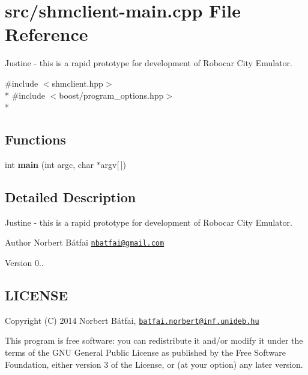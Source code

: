 \hypertarget{shmclient-main_8cpp}{\section{src/shmclient-\/main.cpp File Reference}
\label{shmclient-main_8cpp}
}


Justine -\/ this is a rapid prototype for development of Robocar City Emulator.  


{\ttfamily \#include $<$shmclient.\-hpp$>$}\\*
{\ttfamily \#include $<$boost/program\-\_\-options.\-hpp$>$}\\*
\subsection*{Functions}
\begin{DoxyCompactItemize}
\item 
\hypertarget{shmclient-main_8cpp_a0ddf1224851353fc92bfbff6f499fa97}{int {\bfseries main} (int argc, char $\ast$argv\mbox{[}$\,$\mbox{]})}\label{shmclient-main_8cpp_a0ddf1224851353fc92bfbff6f499fa97}

\end{DoxyCompactItemize}


\subsection{Detailed Description}
Justine -\/ this is a rapid prototype for development of Robocar City Emulator. \begin{DoxyAuthor}{Author}
Norbert Bátfai \href{mailto:nbatfai@gmail.com}{\tt nbatfai@gmail.\-com} 
\end{DoxyAuthor}
\begin{DoxyVersion}{Version}
0..
\end{DoxyVersion}
\hypertarget{traffic_8cpp_LICENSE}{}\subsection{L\-I\-C\-E\-N\-S\-E}\label{traffic_8cpp_LICENSE}
Copyright (C) 2014 Norbert Bátfai, \href{mailto:batfai.norbert@inf.unideb.hu}{\tt batfai.\-norbert@inf.\-unideb.\-hu}

This program is free software\-: you can redistribute it and/or modify it under the terms of the G\-N\-U General Public License as published by the Free Software Foundation, either version 3 of the License, or (at your option) any later version.

